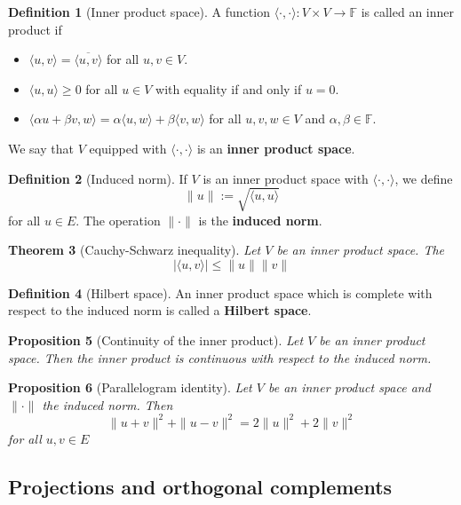 \documentclass[10pt, oneside, reqno]{amsart}
\theoremstyle{plain}%
\newtheorem{thm}{Theorem}[section]
\newtheorem{prop}[thm]{Proposition}
\theoremstyle{definition}
\newtheorem{defn}[thm]{Definition}
\theoremstyle{remark}
\newcommand{\F}{\mathbb{F}}
\newcommand{\iprod}[2]{\langle #1, #2 \rangle}
\newcommand{\ol}[1]{\overline{#1}}
\begin{document}
\begin{defn}[Inner product space]
	A function $\langle \cdot, \cdot \rangle: V \times V \rightarrow \F$ is called an inner product if 
	\begin{itemize}
		\item $\iprod{u}{v} = \ol{\iprod{u}{v}}$ for all $u,v \in V$.
		\item $\iprod{u}{u} \geq 0$ for all $u \in V$ with equality if and only if $u = 0$.
		\item $\iprod{\alpha u + \beta v}{w} = \alpha \iprod{u}{w} + \beta \iprod{v}{w}$ for all $u,v,w \in V$ and $\alpha, \beta \in \F$.
	\end{itemize}
	We say that $V$ equipped with $\iprod{\cdot}{\cdot}$ is an \textbf{inner product space}.
\end{defn}

\begin{defn}[Induced norm]
	If $V$ is an inner product space with $\iprod{\cdot}{\cdot}$, we define \[
		\| u \| := \sqrt{\iprod{u}{u}}
	\] for all $u \in E$.  The operation $\| \cdot \|$ is the \textbf{induced norm}.
\end{defn}

\begin{thm}[Cauchy-Schwarz inequality]
	Let $V$ be an inner product space.  The \[
		|\iprod{u}{v}| \leq \|u \| \| v \|
	\]
\end{thm}

\begin{defn}[Hilbert space]
	An inner product space which is complete with respect to the induced norm is called a \textbf{Hilbert space}.
\end{defn}

\begin{prop}[Continuity of the inner product]
	Let $V$ be an inner product space.  Then the inner product is continuous with respect to the induced norm.  
\end{prop}

\begin{prop}[Parallelogram identity]
	Let $V$ be an inner product space and $\| \cdot \|$ the induced norm.  Then \[
		\| u + v \|^2 + \| u - v \|^2 = 2 \|u \|^2 + 2 \| v \|^2
	\] for all $u,v \in E$
\end{prop}

\subsection{Projections and orthogonal complements} %
\label{sub:projections_and_orthogonal_complements}
\end{document}
